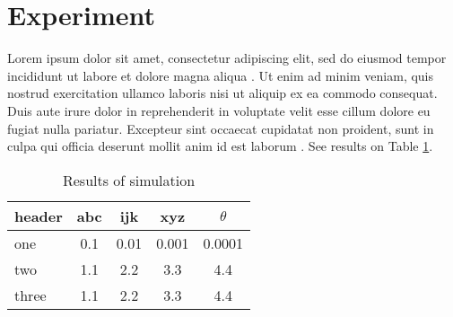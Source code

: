 \section{Experiment}
Lorem ipsum dolor sit amet, consectetur adipiscing elit, sed do eiusmod tempor incididunt ut labore et dolore magna aliqua \cite{Simoen2001}. Ut enim ad minim veniam, quis nostrud exercitation ullamco laboris nisi ut aliquip ex ea commodo consequat. Duis aute irure dolor in reprehenderit in voluptate velit esse cillum dolore eu fugiat nulla pariatur. Excepteur sint occaecat cupidatat non proident, sunt in culpa qui officia deserunt mollit anim id est laborum \cite{Shin2014,Blokhina2020,Dunjko2016}.  See results on Table \ref{results}.

%




\begin{table}[ht]
		\renewcommand{\arraystretch}{1.3}
	\caption{Results of simulation}
	\label{results}
	\centering
	\begin{tabular}{l|c|c|c|c}
		\hline\hline
		header & abc & ijk & xyz & $\theta$ \\
		\hline \hline
		one & 0.1 & 0.01 & 0.001 & 0.0001\\ 
		\hline
		two & 1.1 & 2.2 & 3.3 & 4.4\\
		\hline
		three & 1.1 & 2.2 & 3.3 & 4.4\\
		\hline\hline
	\end{tabular}
\end{table}


